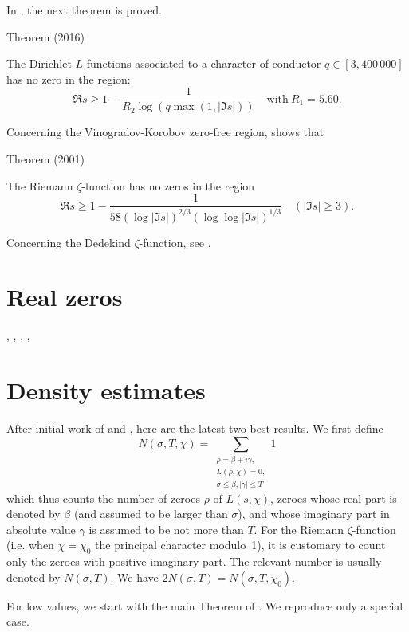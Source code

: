In
\cite{Kadiri*18}, the next
theorem is proved.
\begin{thm}{Theorem (2016)}

  The Dirichlet $L$-functions associated to a character of conductor $q\in[3,400\,000]$ has
  no zero in the region:
  $$
    \Re s \ge 1- \frac1{R_2 \log(q \max(1,| \Im s|))}  \quad\text{with}\
    R_1=5.60. 
  $$
\end{thm}



Concerning the Vinogradov-Korobov zero-free region,
\cite{Ford*01}
shows that

\begin{thm}{Theorem (2001)}

  The Riemann $\zeta$-function has no zeros in the region
  $$
    \Re s\ge  1-\frac{1}{58(\log |\Im s|)^{2/3}(\log\log |\Im s|)^{1/3}}
    \quad(|\Im s|\ge 3).
  $$
\end{thm}


Concerning the Dedekind $\zeta$-function, see
\cite{Kadiri*12}.



\section{Real zeros}


\cite{Rosser*49},
\cite{Rosser*50},
\cite{Chua*05},
\cite{Watkins*00-1},

\section{Density estimates}


After initial work of
\cite{Chen-Wang*89-2}
and
\cite{Liu-Wang*02-1},
here are the latest two best results. We first define
$$
  N(\sigma,T,\chi)=\sum_{\substack{\rho=\beta+i\gamma,\\ L(\rho,\chi)=0,\\
      \sigma\le \beta, |\gamma|\le T}}1
$$
which thus counts the number of zeroes $\rho$ of $L(s,\chi)$, zeroes
whose real part is denoted by $\beta$ (and assumed to be larger than
$\sigma$), and whose imaginary part in absolute value $\gamma$ is assumed to be
not more than $T$. For the Riemann $\zeta$-function (i.e. when
$\chi=\chi_0$ the principal character modulo~1), it is customary
to count only the zeroes with positive imaginary part. The relevant
number is usually denoted by $N(\sigma,T)$. We have $2N(\sigma,T)=N(\sigma,T,\chi_0)$.

For low values, we start with the main Theorem of
\cite{Kadiri-Ng*12}.
We reproduce only a special case.

